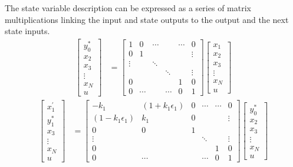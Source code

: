 \documentclass[a4paper,twoside,10pt,english]{report}
\begin{document}
The state variable description can be expressed as a series of matrix
multiplications linking the input and state outputs to the output
and the next state inputs.
\begin{align*}
\left[\begin{array}{c}
y_{0}^{*}\\
x_{2}\\
x_{3}\\
\vdots\\
x_{N}\\
u
\end{array}\right] & = \left[\begin{array}{cccccc}
1 & 0 & \cdots &  & \cdots & 0\\
0 & 1 &  &  &  & \vdots\\
\vdots &  & \ddots\\
 &  &  & \ddots &  & \vdots\\
0 &  &  &  & 1 & 0\\
0 & \cdots &  & \cdots & 0 & 1
\end{array}\right]\left[\begin{array}{c}
x_{1}\\
x_{2}\\
x_{3}\\
\vdots\\
x_{N}\\
u
\end{array}\right]
\end{align*}
\begin{align*}
\left[\begin{array}{c}
x_{1}^{\prime}\\
y_{1}^{*}\\
x_{3}\\
\vdots\\
x_{N}\\
u
\end{array}\right] & = \left[\begin{array}{cccccc}
-k_{1} & \left(1+k_{1}\epsilon_{1}\right) & 0 & \cdots & \cdots & 0\\
\left(1-k_{1}\epsilon_{1}\right) & k_{1} & 0 &  &  & \vdots\\
0 & 0 & 1\\
\vdots &  &  & \ddots &  & \vdots\\
0 &  &  &  & 1 & 0\\
0 & \cdots &  & \cdots & 0 & 1
\end{array}\right]\left[\begin{array}{c}
y_{0}^{*}\\
x_{2}\\
x_{3}\\
\vdots\\
x_{N}\\
u
\end{array}\right]
\end{align*}
\end{document}
